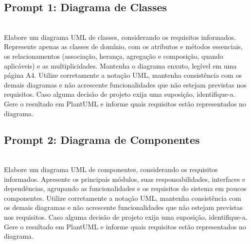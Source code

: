 \documentclass[11pt,a4paper]{article}
\begin{document}
\subsection*{Prompt 1: Diagrama de Classes}
\begin{tcolorbox}\\
Elabore um diagrama UML de classes, considerando os requisitos informados. Represente apenas as classes de domínio, com os atributos e métodos essenciais, os relacionamentos (associação, herança, agregação e composição, quando aplicáveis) e as multiplicidades. Mantenha o diagrama enxuto, legível em uma página A4. Utilize corretamente a notação UML, mantenha consistência com os demais diagramas e não acrescente funcionalidades que não estejam previstas nos requisitos. Caso alguma decisão de projeto exija uma suposição, identifique-a. Gere o resultado em PlantUML e informe quais requisitos estão representados no diagrama.
\end{tcolorbox}

\subsection*{Prompt 2: Diagrama de Componentes}
\begin{tcolorbox}\\
Elabore um diagrama UML de componentes, considerando os requisitos informados. Apresente os principais módulos, suas responsabilidades, interfaces e dependências, agrupando as funcionalidades e os requisitos do sistema em poucos componentes. Utilize corretamente a notação UML, mantenha consistência com os demais diagramas e não acrescente funcionalidades que não estejam previstas nos requisitos. Caso alguma decisão de projeto exija uma suposição, identifique-a. Gere o resultado em PlantUML e informe quais requisitos estão representados no diagrama.
\end{tcolorbox}
\end{document}
